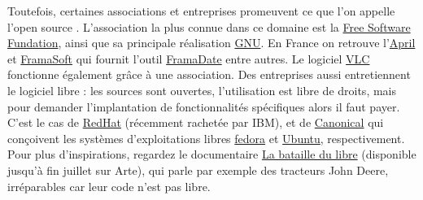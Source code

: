 \documentclass[10pt]{article}
\begin{document}
Toutefois, certaines associations et entreprises promeuvent ce que l'on appelle l'\og open source \fg.
L'association la plus connue dans ce domaine est la \href{https://www.fsf.org/}{Free Software Fundation}, ainsi que
sa principale réalisation \href{https://www.gnu.org/}{GNU}. En France on retrouve l'\href{https://www.april.org/}{April} et
\href{https://framasoft.org/fr/}{FramaSoft} qui fournit l'outil \href{https://framadate.org/}{FramaDate} entre autres.
Le logiciel \href{https://www.videolan.org/index.fr.html}{VLC} fonctionne également grâce à une association.
Des entreprises aussi entretiennent le logiciel libre : les sources sont ouvertes, l'utilisation
est libre de droits, mais pour demander l'implantation de fonctionnalités spécifiques alors il faut
payer. C'est le cas de \href{https://www.redhat.com/fr}{RedHat} (récemment rachetée par IBM), et de \href{https://www.canonical.com/}{Canonical}
qui conçoivent les systèmes d'exploitations libres \href{https://getfedora.org/fr/}{fedora} et \href{https://www.ubuntu.com/download}{Ubuntu}, respectivement.
Pour plus d'inspirations, regardez le documentaire \href{https://www.arte.tv/fr/videos/077346-000-A/internet-ou-la-revolution-du-partage/}{La bataille du libre}
(disponible jusqu'à fin juillet sur Arte), qui parle par exemple des tracteurs John Deere, irréparables car leur code n'est pas libre.
\end{document}
